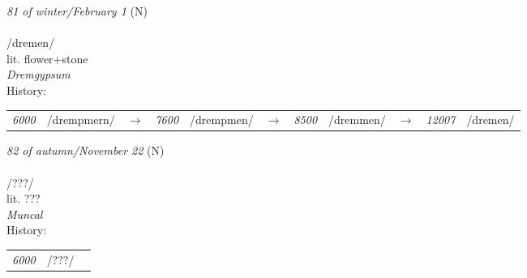 \vspace{15pt}
\begin{nopagebreak}
 \textit{81 of winter/February 1} (N)\\
\\
\noindent /dr{\textprimstress}emen/\\
\noindent lit. flower+stone\\
\noindent \textit{Dremgypsum}\\


\noindent History:

\vspace{-0pt}
\hspace{40pt}
\begin{tabular}{ccc}
\textit{6000} & /drempmern/&$\rightarrow$ & \textit{7600} & /drempmen/&$\rightarrow$ & \textit{8500} & /dremmen/&$\rightarrow$ & \textit{12007} & /dremen/& \\
\end{tabular}

\vspace{20pt}\hline

\end{nopagebreak}
\filbreak



\vspace{15pt}
\begin{nopagebreak}
 \textit{82 of autumn/November 22} (N)\\
\\
\noindent /???/\\
\noindent lit. ???\\
\noindent \textit{Muncal}\\


\noindent History:

\vspace{-0pt}
\hspace{40pt}
\begin{tabular}{ccc}
\textit{6000} & /???/& \\
\end{tabular}

\vspace{20pt}\hline

\end{nopagebreak}
\filbreak



